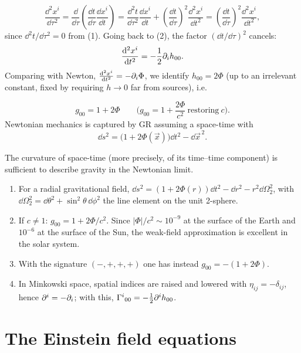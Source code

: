 \[
  \frac{\dd^2x^i}{\dd\tau^2}=\frac{\dd}{\dd\tau}\left(\frac{\dd t}{\dd\tau}\frac{\dd x^i}{\dd t}\right)=\frac{\dd^2t}{\dd\tau^2}\frac{\dd x^i}{\dd t}+\left(\frac{\dd t}{\dd\tau}\right)^2\frac{\dd^2x^i}{\dd t^2}
  =\left(\frac{\dd t}{\dd\tau}\right)^2\frac{\dd^2x^i}{\dd t^2},
\]
since $\dd^2t/\dd\tau^2=0$ from (1). Going back to (2), the factor $(\dd t/\dd\tau)^2$ cancels:
\begin{equation}
  \frac{\mathrm{d}^2x^i}{\mathrm{d} t^2}=-\frac12\partial_ih_{00}.
\end{equation}
Comparing with Newton, $\frac{\mathrm{d}^2x^i}{\mathrm{d} t^2}=-\partial_i\Phi$, we identify $h_{00}=2\Phi$ (up to an irrelevant constant, fixed by requiring $h\to0$ far from sources), i.e.
\begin{keyresult}
\begin{equation}
  g_{00}=1+2\Phi\qquad\Big(g_{00}=1+\frac{2\Phi}{c^2}\ \text{restoring}\ c\Big).
\end{equation}
Newtonian mechanics is captured by GR assuming a space-time with
\begin{equation}
  \dd s^2=\big(1+2\Phi(\vec x)\big)\dd t^2-\dd\vec x^{\,2}.
\end{equation}
\end{keyresult}
The curvature of space-time (more precisely, of its time--time component) is sufficient to describe gravity in the Newtonian limit.

\begin{remarkbox}[Remarks]
\begin{enumerate}[label=(\roman*),nosep]
\item For a radial gravitational field, $\dd s^2=(1+2\Phi(r))\dd t^2-\dd r^2-r^2\dd\Omega_2^2$, with $\dd\Omega_2^2=\dd\theta^2+\sin^2\theta\,\dd\phi^2$ the line element on the unit 2-sphere.
\item If $c\neq1$: $g_{00}=1+2\Phi/c^2$. Since $|\Phi|/c^2\sim10^{-9}$ at the surface of the Earth and $10^{-6}$ at the surface of the Sun, the weak-field approximation is excellent in the solar system.
\item With the signature $(-,+,+,+)$ one has instead $g_{00}=-(1+2\Phi)$.
\item In Minkowski space, spatial indices are raised and lowered with $\eta_{ij}=-\delta_{ij}$, hence $\partial^i=-\partial_i$; with this, $\Gamma^{i}{}_{00}=-\frac12\partial^ih_{00}$.
\end{enumerate}
\end{remarkbox}

\section{The Einstein field equations}


